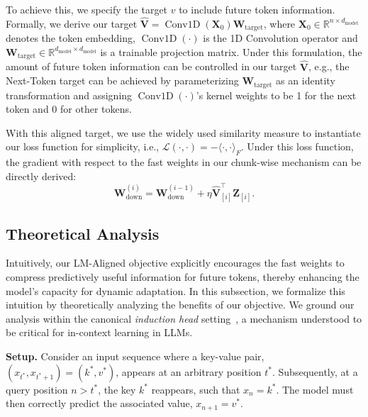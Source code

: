 To achieve this, we specify the target $v$ to include future token information. Formally, we derive our target $\hat{\mathbf{V}} = \operatorname{Conv1D}(\mathbf{X}_0) \mathbf{W}_{\mathrm{target}}$, where $\mathbf{X}_0\in\mathbb{R}^{n\times d_{\mathrm{model}}}$ denotes the token embedding, $\operatorname{Conv1D}(\cdot)$ is the 1D Convolution operator and $\mathbf{W}_{\mathrm{target}} \in \mathbb{R}^{d_{\mathrm{model}} \times d_{\mathrm{model}}}$ is a trainable projection matrix. Under this formulation, the amount of future token information can be controlled in our target $\hat{\mathbf{V}}$, e.g., the Next-Token target can be achieved by parameterizing $\mathbf{W}_{\mathrm{target}}$ as an identity transformation and assigning $\operatorname{Conv1D}(\cdot)$'s kernel weights to be 1 for the next token and 0 for other tokens.

With this aligned target, we use the widely used similarity measure to instantiate our loss function for simplicity, i.e., $\mathcal{L}(\cdot,\cdot)=-\langle\cdot, \cdot\rangle_F$. Under this loss function, the gradient with respect to the fast weights in our chunk-wise mechanism can be directly derived:
\begin{equation}
\label{eq:final_update_rule}
\mathbf{W}_{\mathrm{down}}^{(i)} = \mathbf{W}_{\mathrm{down}}^{(i-1)} + \eta\hat{\mathbf{V}}_{[i]}^\top \mathbf{Z}_{[i]}.
\end{equation}


\subsection{Theoretical Analysis}
\label{sec:theory}

Intuitively, our LM-Aligned objective explicitly encourages the fast weights to compress predictively useful information for future tokens, thereby enhancing the model's capacity for dynamic adaptation. In this subsection, we formalize this intuition by theoretically analyzing the benefits of our objective. We ground our analysis within the canonical \textit{induction head} setting~\citep{olsson2022induction,elhage2021framework}, a mechanism understood to be critical for in-context learning in LLMs.

\textbf{Setup.}
Consider an input sequence where a key-value pair, $(x_{t^*},x_{t^*+1})=(k^*,v^*)$, appears at an arbitrary position $t^*$. Subsequently, at a query position $n>t^*$, the key $k^*$ reappears, such that $x_n=k^*$. The model must then correctly predict the associated value, $x_{n+1}=v^*$. 


